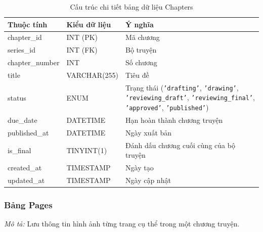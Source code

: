 \noindent
\begin{table}[H]
\centering
\renewcommand{\arraystretch}{1.3}
\begin{tabularx}{\textwidth}{|p{4cm}|p{3cm}|>{\raggedright\arraybackslash}X|}
\hline
\rowcolor{tableheader}
\textbf{Thuộc tính} & \textbf{Kiểu dữ liệu} & \textbf{Ý nghĩa} \\ \hline
chapter\_id & INT (PK) & Mã chương \\ \hline
series\_id & INT (FK) & Bộ truyện \\ \hline
chapter\_number & INT & Số chương \\ \hline
title & VARCHAR(255) & Tiêu đề \\ \hline
status & ENUM & Trạng thái (\texttt{'drafting'}, \texttt{'drawing'}, \texttt{'reviewing\_draft'}, \texttt{'reviewing\_final'}, \texttt{'approved'}, \texttt{'published'}) \\ \hline
due\_date & DATETIME & Hạn hoàn thành chương truyện \\ \hline
published\_at & DATETIME & Ngày xuất bản \\ \hline
is\_final & TINYINT(1) & Đánh dấu chương cuối cùng của bộ truyện \\ \hline
created\_at & TIMESTAMP & Ngày tạo \\ \hline
updated\_at & TIMESTAMP & Ngày cập nhật \\ \hline
\end{tabularx}
\caption{Cấu trúc chi tiết bảng dữ liệu Chapters}
\label{tab:db_chapters}
\end{table}
\vspace{0.5cm}

\subsubsection{Bảng Pages}
\label{subsubsec:tbl_pages}
\textit{Mô tả:} Lưu thông tin hình ảnh từng trang cụ thể trong một chương truyện.

